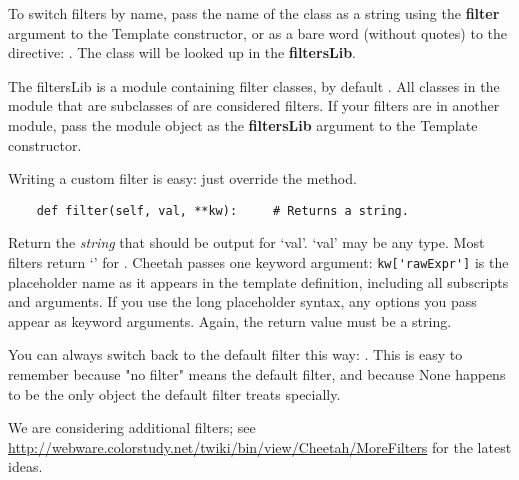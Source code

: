 To switch filters by name, pass the name of the class as a string using the
{\bf filter} argument to the Template constructor, or as a bare word (without
quotes) to the  directive: .  The
class will be looked up in the {\bf filtersLib}.

The filtersLib is a module containing filter classes, by default
.  All classes in the module that are subclasses of
 are considered filters.  If your filters are in
another module, pass the module object as the {\bf filtersLib} argument to the
Template constructor.  

Writing a custom filter is easy: just override the  method.
\begin{verbatim}
    def filter(self, val, **kw):     # Returns a string.
\end{verbatim}
Return the {\em string} that should be output for `val'.  `val' may be any
type.  Most filters return `' for .  Cheetah passes one keyword
argument: \verb+kw['rawExpr']+ is the placeholder name as it appears in
the template definition, including all subscripts and arguments.  If you use
the long placeholder syntax, any options you pass appear as keyword
arguments.  Again, the return value must be a string.

You can always switch back to the default filter this way:
.  This is easy to remember because "no filter" means the
default filter, and because None happens to be the only object the default
filter treats specially.

We are considering additional filters; see
\url{http://webware.colorstudy.net/twiki/bin/view/Cheetah/MoreFilters}
for the latest ideas.






